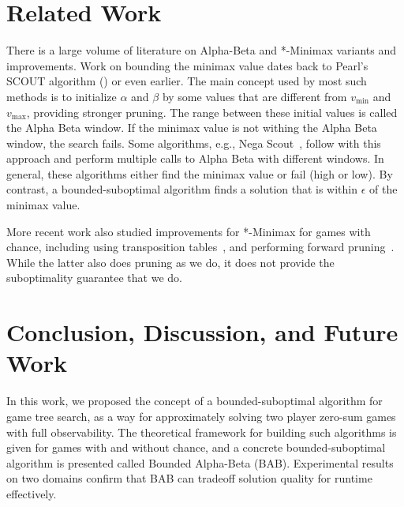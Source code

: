 \documentclass[letterpaper]{article} %
\newcommand{\vmax}{v_{\text{max}}}
\newcommand{\vmin}{v_{\text{min}}}
\begin{document}
\section{Related Work}

There is a large volume of literature on Alpha-Beta and *-Minimax variants and improvements. 
Work on bounding the minimax value dates back to Pearl's SCOUT algorithm (\citeyear{pearl1980scout}) or even earlier. The main concept used by most such methods is to initialize $\alpha$ and $\beta$ by some values that are different from $\vmin$ and $\vmax$, providing stronger pruning. 
The range between these initial values is called the Alpha Beta window. If the minimax value is not withing the Alpha Beta window, the search fails. Some algorithms, e.g., Nega Scout~\cite{reinefeld1983improvement}, follow with this approach and perform multiple calls to Alpha Beta with different windows. 
In general, these algorithms either find the minimax value or fail (high or low). By contrast, a bounded-suboptimal algorithm finds a solution that is within $\epsilon$ of the minimax value. %

More recent work also studied improvements for *-Minimax for games with chance, including using transposition tables~\cite{veness2007effective}, and performing forward pruning~\cite{schadd2009chanceprobcut}. While the latter also does pruning as we do, it does not provide the suboptimality guarantee that we do. 

\section{Conclusion, Discussion, and Future Work}
In this work, we proposed the concept of a bounded-suboptimal algorithm for game tree search, as a way for approximately solving two player zero-sum games with full observability. The theoretical framework for building such algorithms is given for games with and without chance, and a concrete bounded-suboptimal algorithm is presented called Bounded Alpha-Beta (BAB). Experimental results on two domains confirm that BAB can tradeoff solution quality for runtime effectively. 
\end{document}
